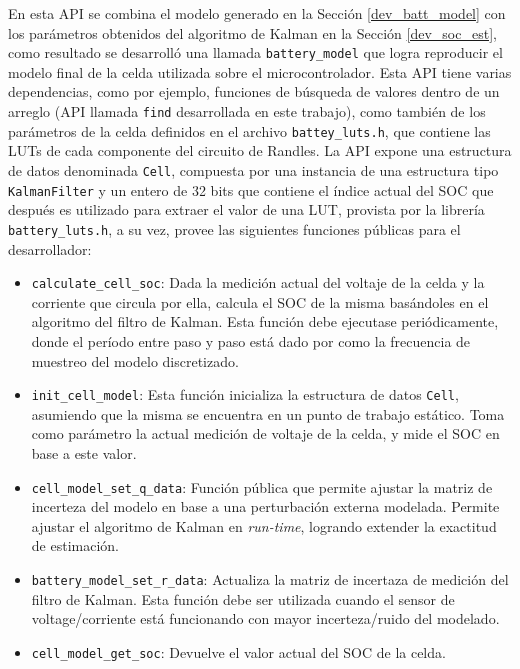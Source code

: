 \documentclass[10pt, a4paper]{article}
\begin{document}
En esta \acrshort{API} se combina el modelo generado en la Secci\'on
\ref{dev_batt_model} con los par\'ametros obtenidos del algoritmo de Kalman en
la Secci\'on \ref{dev_soc_est}, como resultado se desarroll\'o una 
llamada \texttt{battery\_model} que logra reproducir el modelo final de la celda
utilizada sobre el microcontrolador. Esta \acrshort{API} tiene varias 
dependencias, como por ejemplo, funciones de b\'usqueda de valores dentro de un 
arreglo (\acrshort{API} llamada \texttt{find} desarrollada en este trabajo), 
como tambi\'en de los par\'ametros de la celda definidos en el archivo 
\texttt{battey\_luts.h}, que contiene las \acrshort{LUT}s de cada componente del
circuito de Randles. La \acrshort{API} expone una estructura de datos denominada
\texttt{Cell}, compuesta por una instancia de una estructura tipo
\texttt{KalmanFilter} y un entero de 32 bits que contiene el \'indice actual del
\acrshort{SOC} que despu\'es es utilizado para extraer el valor de una
\acrshort{LUT}, provista por la librer\'ia \texttt{battery\_luts.h}, a su vez,
provee las siguientes funciones p\'ublicas para el desarrollador: 

\begin{itemize}
    \item \texttt{calculate\_cell\_soc}: Dada la medici\'on actual del voltaje de
        la celda y la corriente que circula por ella, calcula el \acrshort{SOC}
        de la misma bas\'andoles en el algoritmo del filtro de Kalman. Esta
        funci\'on debe ejecutase peri\'odicamente, donde el per\'iodo entre
        paso y paso est\'a dado por como la frecuencia de muestreo del modelo
        discretizado.
    \item \texttt{init\_cell\_model}: Esta funci\'on inicializa la estructura de
        datos \texttt{Cell}, asumiendo que la misma se encuentra en un punto de
        trabajo est\'atico. Toma como par\'ametro la actual medici\'on de
        voltaje de la celda, y mide el \acrshort{SOC} en base a este valor.
    \item \texttt{cell\_model\_set\_q\_data}: Funci\'on p\'ublica que permite
        ajustar la matriz de incerteza del modelo en base a una perturbaci\'on
        externa modelada. Permite ajustar el algoritmo de Kalman en 
        \emph{run-time}, logrando extender la exactitud de estimaci\'on.
    \item \texttt{battery\_model\_set\_r\_data}: Actualiza la matriz de
        incertaza de medici\'on del filtro de Kalman. Esta funci\'on debe ser
        utilizada cuando el sensor de voltage/corriente est\'a funcionando con
        mayor incerteza/ruido del modelado.
    \item \texttt{cell\_model\_get\_soc}: Devuelve el valor actual del
        \acrshort{SOC} de la celda.
\end{itemize}
\end{document}
